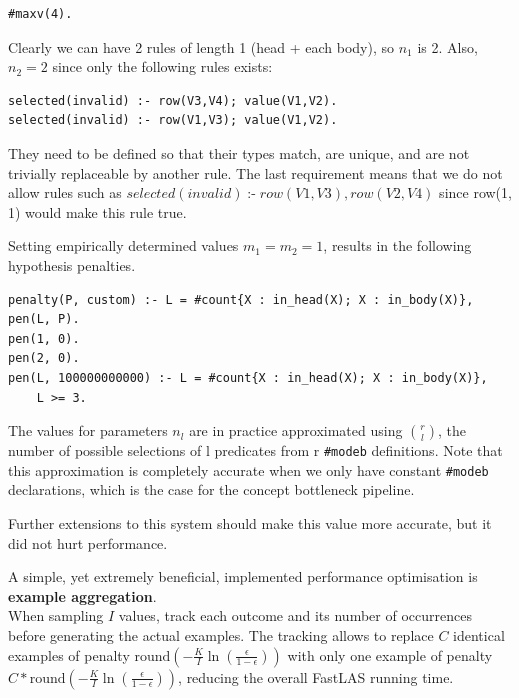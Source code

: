 \begin{example}
\begin{verbatim}
#maxv(4).
\end{verbatim}

Clearly we can have 2 rules of length 1 (head + each body), so $n_1$ is 2.
Also, $n_2 = 2$ since only the following rules exists:
\begin{verbatim}
selected(invalid) :- row(V3,V4); value(V1,V2).
selected(invalid) :- row(V1,V3); value(V1,V2).
\end{verbatim}
They need to be defined so that their types match, are unique, and are not trivially replaceable by another rule.
The last requirement means that we do not allow rules such as $selected(invalid) \; \text{:-} \; row(V1, V3), row(V2, V4)$ since row(1, 1) would make this rule true.

Setting empirically determined values $m_1 = m_2 = 1$, results in the following hypothesis penalties.
\begin{lstlisting}
penalty(P, custom) :- L = #count{X : in_head(X); X : in_body(X)}, pen(L, P).
pen(1, 0).
pen(2, 0).
pen(L, 100000000000) :- L = #count{X : in_head(X); X : in_body(X)}, 
    L >= 3.
\end{lstlisting}

The values for parameters $n_l$ are in practice approximated using $\binom{r}{l}$, the number of possible selections of l predicates from r \verb_#modeb_ definitions.
Note that this approximation is completely accurate when we only have constant \verb_#modeb_ declarations, which is the case for the concept bottleneck pipeline.

Further extensions to this system should make this value more accurate, but it did not hurt performance.

\end{example}


A simple, yet extremely beneficial, implemented performance optimisation is \textbf{example aggregation}. \\
When sampling $I$ values, track each outcome and its number of occurrences before generating the actual examples.
The tracking allows to replace $C$ identical examples of penalty $\text{round} \left ( -\frac{K}{I} \ln \left ( \frac{\epsilon}{1 - \epsilon} \right ) \right )$ with only one example of penalty $C * \text{round} \left ( -\frac{K}{I} \ln \left ( \frac{\epsilon}{1 - \epsilon} \right ) \right )$, reducing the overall FastLAS running time.


